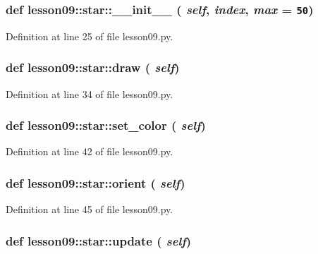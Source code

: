 \subsubsection{\setlength{\rightskip}{0pt plus 5cm}def lesson09::star::\_\-\_\-init\_\-\_\- ( {\em self},  {\em index},  {\em max} = {\tt 50})}\label{classlesson09_1_1star_fd121fd88bc4b1bd61100e7713a8de3f}




Definition at line 25 of file lesson09.py.
\subsubsection{\setlength{\rightskip}{0pt plus 5cm}def lesson09::star::draw ( {\em self})}\label{classlesson09_1_1star_f7f91e467493654bd136552b6a3ab23b}




Definition at line 34 of file lesson09.py.
\subsubsection{\setlength{\rightskip}{0pt plus 5cm}def lesson09::star::set\_\-color ( {\em self})}\label{classlesson09_1_1star_dc8211900de6836bb32d9b6b5bd375d5}




Definition at line 42 of file lesson09.py.
\subsubsection{\setlength{\rightskip}{0pt plus 5cm}def lesson09::star::orient ( {\em self})}\label{classlesson09_1_1star_14432fc542994d10700e1b35badf5c5f}




Definition at line 45 of file lesson09.py.
\subsubsection{\setlength{\rightskip}{0pt plus 5cm}def lesson09::star::update ( {\em self})}\label{classlesson09_1_1star_f92daf4da78c69083ab69ae05b8f671e}




